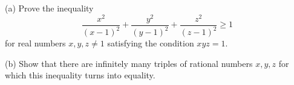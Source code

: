 (a) Prove the inequality
\[
\frac{x^{2}}{(x-1)^{2}}+\frac{y^{2}}{(y-1)^{2}}+\frac{z^{2}}{(z-1)^{2}}\geq 1
\]
for real numbers $x,y,z\neq 1$ satisfying the condition $xyz=1$.

(b) Show that there are infinitely many triples of rational numbers $x,y,z$ for which this inequality turns into equality.
